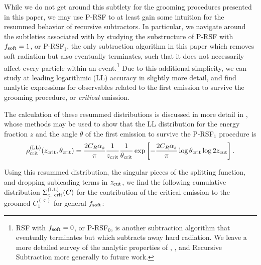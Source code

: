 While we do not get around this subtlety for the \PIRANHA{} grooming procedures presented in this paper, we may use P-RSF to at least gain some intuition for the resummed behavior of recursive subtractors.
%
In particular, we navigate around the subtleties associated with \PIRANHA{} by studying the substructure of P-RSF with \(f_{\rm soft} = 1\), or P-RSF\(_{1}\), the only subtraction algorithm in this paper which removes soft radiation but also eventually terminates, such that it does not necessarily affect every particle within an event.\footnote{
RSF with \(f_{\rm soft} = 0\), or P-RSF\(_{0}\), is another subtraction algorithm that eventually terminates but which subtracts away hard radiation.
%
We leave a more detailed survey of the analytic properties of , , and Recursive Subtraction more generally to future work.
}
%
Due to this additional simplicity, we can study  at leading logarithmic (LL) accuracy in slightly more detail, and find analytic expressions for observables related to the first emission to survive the grooming procedure, or \textit{critical} emission.

The calculation of these resummed distributions is discussed in more detail in , whose methods may be used to show that the LL distribution for the energy fraction \(z\) and the angle \(\theta\) of the first emission to survive the P-RSF\(_1\) procedure is
%
\begin{equation}
    \rho^{\rm(LL)}_{\rm crit}(z_{\rm crit}, \theta_{\rm crit})
    =
    \frac{2 C_R \alpha_s}{\pi}
    \frac{1}{z_{\rm crit}}\frac{1}{\theta_{\rm crit}}
    \exp\left[-\frac{2 C_R \alpha_s}{\pi}
    \log\theta_{\rm crit}
    \log 2 z_{\rm cut}
    \right]
    .
\end{equation}

Using this resummed distribution, the singular pieces of the splitting function, and dropping subleading terms in \(z_{\rm cut}\), we find the following cumulative distribution \(\Sigma^{\rm(LL)}_{\varsigma,~{\rm crit}}(C)\) for the contribution of the critical emission to the groomed \(C_1^{(\varsigma)}\)  for general \(f_{\rm soft}\):



